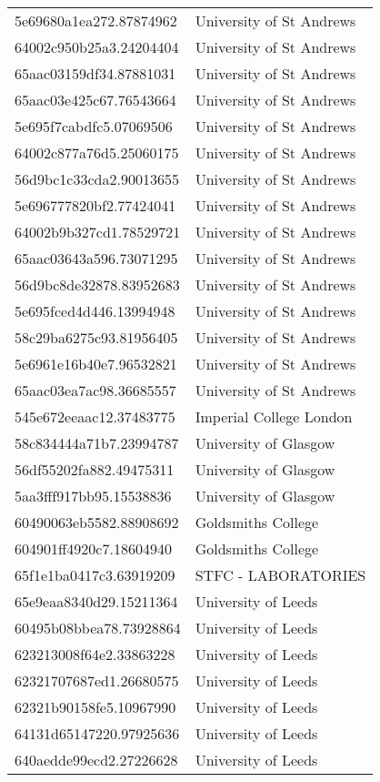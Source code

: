 \begin{tabular}{ll}
5e69680a1ea272.87874962 & University of St Andrews \\
64002c950b25a3.24204404 & University of St Andrews \\
65aac03159df34.87881031 & University of St Andrews \\
65aac03e425c67.76543664 & University of St Andrews \\
5e695f7cabdfc5.07069506 & University of St Andrews \\
64002c877a76d5.25060175 & University of St Andrews \\
56d9bc1c33cda2.90013655 & University of St Andrews \\
5e696777820bf2.77424041 & University of St Andrews \\
64002b9b327cd1.78529721 & University of St Andrews \\
65aac03643a596.73071295 & University of St Andrews \\
56d9bc8de32878.83952683 & University of St Andrews \\
5e695fced4d446.13994948 & University of St Andrews \\
58c29ba6275c93.81956405 & University of St Andrews \\
5e6961e16b40e7.96532821 & University of St Andrews \\
65aac03ea7ac98.36685557 & University of St Andrews \\
545e672eeaac12.37483775 & Imperial College London \\
58c834444a71b7.23994787 & University of Glasgow \\
56df55202fa882.49475311 & University of Glasgow \\
5aa3fff917bb95.15538836 & University of Glasgow \\
60490063eb5582.88908692 & Goldsmiths College \\
604901ff4920c7.18604940 & Goldsmiths College \\
65f1e1ba0417c3.63919209 & STFC - LABORATORIES \\
65e9eaa8340d29.15211364 & University of Leeds \\
60495b08bbea78.73928864 & University of Leeds \\
623213008f64e2.33863228 & University of Leeds \\
62321707687ed1.26680575 & University of Leeds \\
62321b90158fe5.10967990 & University of Leeds \\
64131d65147220.97925636 & University of Leeds \\
640aedde99ecd2.27226628 & University of Leeds \\

\end{tabular}
